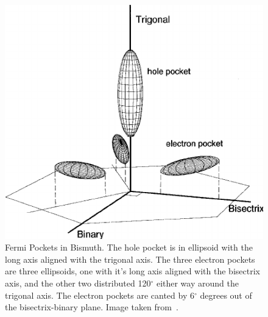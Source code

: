 \documentclass{thesis-umich}
\begin{document}
\begin{figure}
	\centering
	\caption[Fermi Pockets in Bismuth]{Fermi Pockets in Bismuth. The hole pocket is in ellipsoid with the long axis aligned with the trigonal axis. The three electron pockets are three ellipsoids, one with it's long axis aligned with the bisectrix axis, and the other two distributed 120$^\circ$ either way around the trigonal axis. The electron pockets are canted by 6$^\circ$ degrees out of the bisectrix-binary plane. Image taken from~\cite{Yang2001}.}
	\label{fig:bismuth_pockets}
	\includegraphics[width=0.5\columnwidth]{figures/bismuth_pockets.png}
\end{figure}
\end{document}
